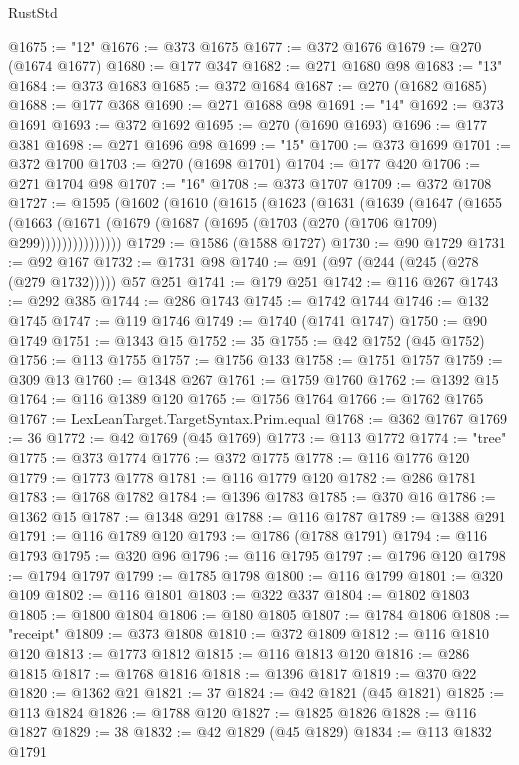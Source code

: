 \begin{lexlean}{RustStd}
\begin{coremodule}
@1675 := "12"
@1676 := @373 @1675
@1677 := @372 @1676
@1679 := @270 (@1674 @1677)
@1680 := @177 @347
@1682 := @271 @1680 @98
@1683 := "13"
@1684 := @373 @1683
@1685 := @372 @1684
@1687 := @270 (@1682 @1685)
@1688 := @177 @368
@1690 := @271 @1688 @98
@1691 := "14"
@1692 := @373 @1691
@1693 := @372 @1692
@1695 := @270 (@1690 @1693)
@1696 := @177 @381
@1698 := @271 @1696 @98
@1699 := "15"
@1700 := @373 @1699
@1701 := @372 @1700
@1703 := @270 (@1698 @1701)
@1704 := @177 @420
@1706 := @271 @1704 @98
@1707 := "16"
@1708 := @373 @1707
@1709 := @372 @1708
@1727 := @1595
    (@1602
      (@1610
        (@1615
          (@1623
            (@1631
              (@1639
                (@1647
                  (@1655
                    (@1663
                      (@1671 (@1679 (@1687 (@1695 (@1703 (@270 (@1706 @1709) @299)))))))))))))))
@1729 := @1586 (@1588 @1727)
@1730 := @90 @1729
@1731 := @92 @167
@1732 := @1731 @98
@1740 := @91 (@97 (@244 (@245 (@278 (@279 @1732))))) @57 @251
@1741 := @179 @251
@1742 := @116 @267
@1743 := @292 @385
@1744 := @286 @1743
@1745 := @1742 @1744
@1746 := @132 @1745
@1747 := @119 @1746
@1749 := @1740 (@1741 @1747)
@1750 := @90 @1749
@1751 := @1343 @15
@1752 := 35
@1755 := @42 @1752 (@45 @1752)
@1756 := @113 @1755
@1757 := @1756 @133
@1758 := @1751 @1757
@1759 := @309 @13
@1760 := @1348 @267
@1761 := @1759 @1760
@1762 := @1392 @15
@1764 := @116 @1389 @120
@1765 := @1756 @1764
@1766 := @1762 @1765
@1767 := LexLeanTarget.TargetSyntax.Prim.equal
@1768 := @362 @1767
@1769 := 36
@1772 := @42 @1769 (@45 @1769)
@1773 := @113 @1772
@1774 := "tree"
@1775 := @373 @1774
@1776 := @372 @1775
@1778 := @116 @1776 @120
@1779 := @1773 @1778
@1781 := @116 @1779 @120
@1782 := @286 @1781
@1783 := @1768 @1782
@1784 := @1396 @1783
@1785 := @370 @16
@1786 := @1362 @15
@1787 := @1348 @291
@1788 := @116 @1787
@1789 := @1388 @291
@1791 := @116 @1789 @120
@1793 := @1786 (@1788 @1791)
@1794 := @116 @1793
@1795 := @320 @96
@1796 := @116 @1795
@1797 := @1796 @120
@1798 := @1794 @1797
@1799 := @1785 @1798
@1800 := @116 @1799
@1801 := @320 @109
@1802 := @116 @1801
@1803 := @322 @337
@1804 := @1802 @1803
@1805 := @1800 @1804
@1806 := @180 @1805
@1807 := @1784 @1806
@1808 := "receipt"
@1809 := @373 @1808
@1810 := @372 @1809
@1812 := @116 @1810 @120
@1813 := @1773 @1812
@1815 := @116 @1813 @120
@1816 := @286 @1815
@1817 := @1768 @1816
@1818 := @1396 @1817
@1819 := @370 @22
@1820 := @1362 @21
@1821 := 37
@1824 := @42 @1821 (@45 @1821)
@1825 := @113 @1824
@1826 := @1788 @120
@1827 := @1825 @1826
@1828 := @116 @1827
@1829 := 38
@1832 := @42 @1829 (@45 @1829)
@1834 := @113 @1832 @1791

\end{coremodule}
\end{lexlean}
